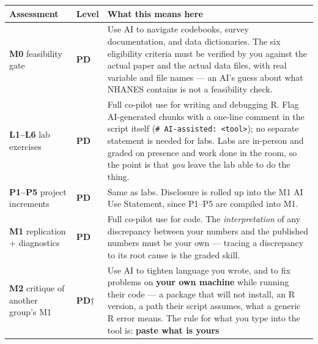 \documentclass[
]{article}
\newcounter{none} %
\begin{document}
{\def\LTcaptype{none} %
\begin{longtable}[]{@{}
  >{\raggedright\arraybackslash}p{}
  >{\raggedright\arraybackslash}p{}
  >{\raggedright\arraybackslash}p{}@{}}
\toprule\noalign{}
\begin{minipage}[b]{\linewidth}\raggedright
Assessment
\end{minipage} & \begin{minipage}[b]{\linewidth}\raggedright
Level
\end{minipage} & \begin{minipage}[b]{\linewidth}\raggedright
What this means here
\end{minipage} \\
\midrule\noalign{}
\endhead
\bottomrule\noalign{}
\endlastfoot
\textbf{M0} feasibility gate & \textbf{PD} & Use AI to navigate
codebooks, survey documentation, and data dictionaries. The six
eligibility criteria must be verified by you against the actual paper
and the actual data files, with real variable and file names --- an AI's
guess about what NHANES contains is not a feasibility check. \\
\textbf{L1--L6} lab exercises & \textbf{PD} & Full co-pilot use for
writing and debugging R. Flag AI-generated chunks with a one-line
comment in the script itself
(\texttt{\#\ AI-assisted:\ \textless{}tool\textgreater{}}); no separate
statement is needed for labs. Labs are in-person and graded on presence
and work done in the room, so the point is that \emph{you} leave the lab
able to do the thing. \\
\textbf{P1--P5} project increments & \textbf{PD} & Same as labs.
Disclosure is rolled up into the M1 AI Use Statement, since P1--P5 are
compiled into M1. \\
\textbf{M1} replication + diagnostics & \textbf{PD} & Full co-pilot use
for code. The \emph{interpretation} of any discrepancy between your
numbers and the published numbers must be your own --- tracing a
discrepancy to its root cause is the graded skill. \\
\textbf{M2} critique of another group's M1 & \textbf{PD}† & Use AI to
tighten language you wrote, and to fix problems on \textbf{your own
machine} while running their code --- a package that will not install,
an R version, a path their script assumes, what a generic R error means.
The rule for what you type into the tool is: \textbf{paste what is yours
}
\end{longtable}}
\end{document}
